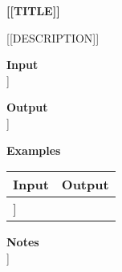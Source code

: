 \documentclass{article}%
\begin{document}
%
\begin{center}%
{\LARGE{\textbf{[[TITLE]]}}}%
\end{center}%

[[DESCRIPTION]]

\textbf{Input}\\%
[[INPUT]]%

\textbf{Output}\\%
[[OUTPUT]]%

\textbf{Examples}\\%
\noindent%
\begin{tabular}[t]{|p{}|p{}|}%
\hline%
\textbf{Input} & \textbf{Output} \\\hline%
[[VERBATIM_EXAMPLE_PER_ROW]]%
\end{tabular}%

\textbf{Notes}\\%
[[NOTES]]%
\end{document}
